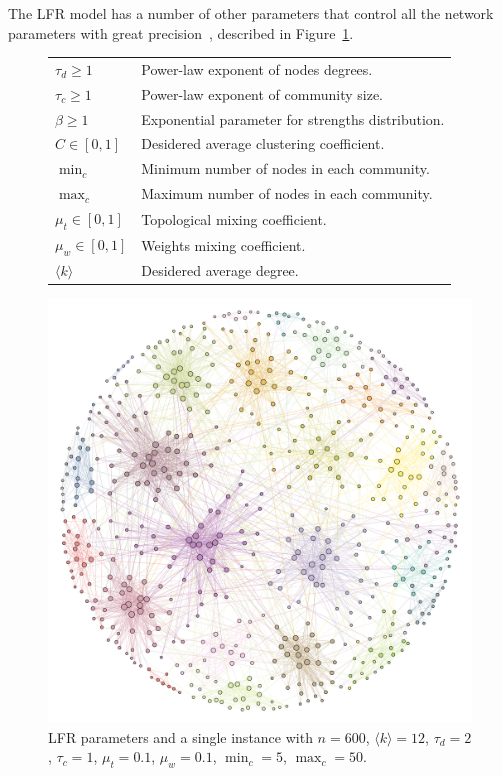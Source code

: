 The LFR model has a number of other parameters that control all the network parameters with great precision~\cite{lancichinetti2008,lancichinetti2009a}, described in Figure~\ref{tab:lfrparams}.
\begin{figure}[htb!]\centering
\begin{footnotesize}
\noindent\begin{minipage}[b!]{0.46\textwidth}
\begin{tabular}{l|p{}}
\hline
$\tau_d \geq 1$ & Power-law exponent of nodes degrees.\\
$\tau_c \geq 1$ & Power-law exponent of community size.\\
$\beta \geq 1$  &Exponential parameter for strengths distribution.\\
$C \in [0,1]$ & Desidered average clustering coefficient.\\
$\min_c$ & Minimum number of nodes in each community.\\
$\max_c$  & Maximum number of nodes in each community.\\
$\mu_t \in [0,1]$ & Topological mixing coefficient.\\
$\mu_w \in [0,1]$ & Weights mixing coefficient.\\
$\langle k\rangle $ &Desidered average degree.\\
\hline
\end{tabular}
\end{minipage}\hfill
\begin{minipage}[b!]{0.35\textwidth}\flushright
\includegraphics[width=1\textwidth]{images/LFRexample.pdf}
\end{minipage}
\end{footnotesize}
\caption{LFR parameters and a single instance with $n=600$, $\langle k \rangle =12$, $\tau_d=2$, $\tau_c=1$, $\mu_t=0.1$, $\mu_w=0.1$, $\min_c=5$, $\max_c=50$.}
\label{tab:lfrparams}
\end{figure}

